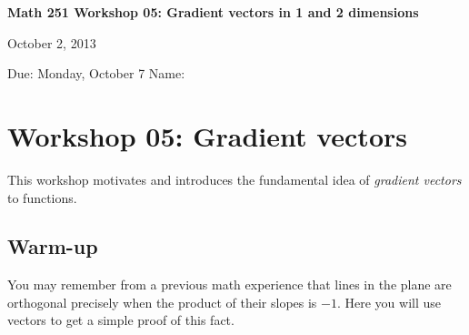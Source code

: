 \documentclass[12pt]{exam}
\theoremstyle{definition}
\begin{document}
\noindent
\textbf{{\large Math 251 \hfill Workshop 05: Gradient vectors in 1 and 2 dimensions}}

\noindent
October 2, 2013 

\noindent
Due: Monday, October 7 \hfill Name: \underline{\hspace{3in}} 

\noindent

\newtheorem{fact}{Fact}

\section{Workshop 05: Gradient vectors}

This workshop motivates and introduces the fundamental idea of
\emph{gradient vectors} to functions.

\subsection{Warm-up}

You may remember from a previous math experience that lines in the plane
are orthogonal precisely when the product of their slopes is $-1$. Here
you will use vectors to get a simple proof of this fact.
\end{document}
